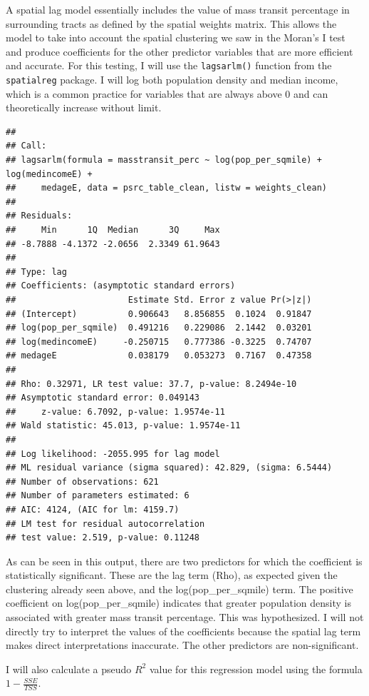 \documentclass[
]{article}
\begin{document}
A spatial lag model essentially includes the value of mass transit
percentage in surrounding tracts as defined by the spatial weights
matrix. This allows the model to take into account the spatial
clustering we saw in the Moran's I test and produce coefficients for the
other predictor variables that are more efficient and accurate. For this
testing, I will use the \texttt{lagsarlm()} function from the
\texttt{spatialreg} package. I will log both population density and
median income, which is a common practice for variables that are always
above 0 and can theoretically increase without limit.

\begin{verbatim}
## 
## Call:
## lagsarlm(formula = masstransit_perc ~ log(pop_per_sqmile) + log(medincomeE) + 
##     medageE, data = psrc_table_clean, listw = weights_clean)
## 
## Residuals:
##     Min      1Q  Median      3Q     Max 
## -8.7888 -4.1372 -2.0656  2.3349 61.9643 
## 
## Type: lag 
## Coefficients: (asymptotic standard errors) 
##                      Estimate Std. Error z value Pr(>|z|)
## (Intercept)          0.906643   8.856855  0.1024  0.91847
## log(pop_per_sqmile)  0.491216   0.229086  2.1442  0.03201
## log(medincomeE)     -0.250715   0.777386 -0.3225  0.74707
## medageE              0.038179   0.053273  0.7167  0.47358
## 
## Rho: 0.32971, LR test value: 37.7, p-value: 8.2494e-10
## Asymptotic standard error: 0.049143
##     z-value: 6.7092, p-value: 1.9574e-11
## Wald statistic: 45.013, p-value: 1.9574e-11
## 
## Log likelihood: -2055.995 for lag model
## ML residual variance (sigma squared): 42.829, (sigma: 6.5444)
## Number of observations: 621 
## Number of parameters estimated: 6 
## AIC: 4124, (AIC for lm: 4159.7)
## LM test for residual autocorrelation
## test value: 2.519, p-value: 0.11248
\end{verbatim}

As can be seen in this output, there are two predictors for which the
coefficient is statistically significant. These are the lag term (Rho),
as expected given the clustering already seen above, and the
log(pop\_per\_sqmile) term. The positive coefficient on
log(pop\_per\_sqmile) indicates that greater population density is
associated with greater mass transit percentage. This was hypothesized.
I will not directly try to interpret the values of the coefficients
because the spatial lag term makes direct interpretations inaccurate.
The other predictors are non-significant.

I will also calculate a pseudo \(R^2\) value for this regression model
using the formula \(1 - \frac{SSE}{TSS}\).
\end{document}
